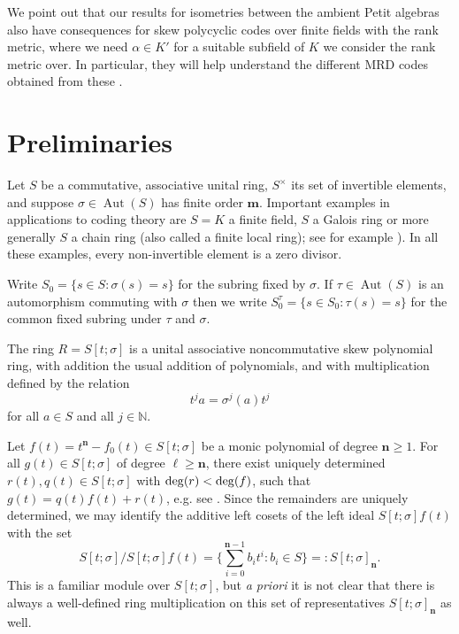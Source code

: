 \documentclass[11pt]{amsart}
\theoremstyle{plain}
\theoremstyle{definition}
\numberwithin{equation}{section}
\numberwithin{figure}{section}
\newcommand{\Sf}{\Stsigma/\Stsigma f(t)} %
\newcommand{\ring}{S}
\newcommand{\field}{K}
\newcommand{\Stsigma}{S[t;\sigma]}
\newcommand{\fixedts}{S_0^\tau}
\newcommand{\os}{\mathbf{m}}  %
\newcommand{\de}{\mathbf{n}}  %
\newcommand{\N}{\mathbb{N}}
\DeclareMathOperator{\Aut}{Aut}
\begin{document}



We point out that our results for isometries between the ambient Petit algebras also have consequences for skew polycyclic codes over finite fields with the rank metric, where we need $\alpha\in K'$ for a suitable subfield of $K$  we consider the rank metric over. In particular,  they will  help understand the different  MRD codes obtained from these \cite[Proposition 3.13]{OuazzouHorlemannAydin2025}.

\section{Preliminaries}\label{S:prel}

Let $\ring$ be a commutative, associative unital ring, $S^\times$ its set of invertible elements, and suppose $\sigma\in \Aut(\ring)$ has finite order $\os$.  Important examples in applications to coding theory are $\ring=\field$ a finite field, $\ring$  a Galois ring or more generally $\ring$ a chain ring (also called a
finite local ring); see for example \cite[\S5.1]{Pumpluen2017}).   In all these examples, every non-invertible element is a zero divisor.

 Write $\ring_0=\{s\in \ring: \sigma(s)=s\}$ for the subring fixed by $\sigma$.
If $\tau\in \Aut(\ring)$ is an automorphism commuting with $\sigma$ then we write $\fixedts=\{s\in S_0: \tau(s)=s\}$ for the common fixed subring under $\tau$ and $\sigma$.

The ring $R=\Stsigma$ is a unital associative noncommutative skew polynomial ring, with addition the usual addition of polynomials, and with multiplication defined by the relation
$$
t^ja=\sigma^j(a)t^j
$$
for all $a\in \ring$ and all $j\in \N$. 



Let  $f(t)=t^{\de}-f_0(t)\in \ring[t;\sigma]$ be a monic polynomial of degree $\de\geq 1$.
For all $g(t)\in  \ring[t;\sigma]$ of degree $\ell\geq \de$, there exist uniquely
determined $r(t),q(t)\in  \Stsigma$ with
 ${\rm deg}(r)<{\rm deg}(f)$, such that
$g(t)=q(t)f(t)+r(t)$, e.g. see \cite[Proposition 1]{Pumpluen2017}.
Since the remainders are uniquely determined, we may identify the additive left cosets of the left ideal $\Stsigma f(t)$ with the set
$$
\Sf = \{ \sum_{i=0}^{\de-1} b_it^i : b_i\in \ring\} =: \Stsigma_\de.
$$
 This is a familiar module over $\Stsigma$, but \emph{a priori} it is not clear that there is always a well-defined ring multiplication on this set of representatives $\Stsigma_\de$ 
 as well.
\end{document}
